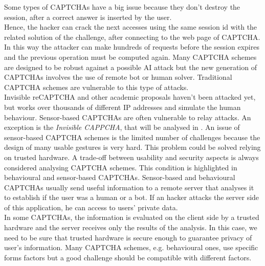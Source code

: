 \begin{itemize}
{Some types of CAPTCHAs have a big issue because they don't destroy the session, after a correct answer is inserted by the user\cite{text_audio}.\\
Hence, the hacker can crack the next accesses using the same session id with the related solution of the challenge, after connecting to the web page of CAPTCHA. In this way the attacker can make hundreds of requests before the session expires and the previous operation must be computed again.}
{Many CAPTCHA schemes are designed to be robust against a possible AI attack but the new generation of CAPTCHAs involves the use of remote bot or human solver. Traditional CAPTCHA schemes are vulnerable to this type of attacks.\\
Invisible reCAPTCHA and other academic proposals haven't been attacked yet, but works over thousands of different IP addresses and simulate the human behaviour. Sensor-based CAPTCHAs are often vulnerable to relay attacks. An exception is the \textit{Invisible CAPPCHA}, that will be analysed in .
}
{An issue of sensor-based CAPTCHA schemes is the limited number of challenges because the design of many usable gestures is very hard. This problem could be solved
relying on trusted hardware.}
{A trade-off between usability and security aspects is always considered analysing CAPTCHA schemes. This condition is highlighted in behavioural and sensor-based CAPTCHAs.}
{Sensor-based and behavioural CAPTCHAs usually send useful information to a remote server that analyses it to establish if the user was a human or a bot. If an hacker attacks the server side of this application, he can access to users' private data.\\
In some CAPTCHAs, the information is evaluated on the client side by a trusted hardware and the server receives only the results of the analysis. In this case, we need to be sure that trusted hardware is secure enough to guarantee privacy of user's information.
}
{Many CAPTCHA schemes, e.g. behavioural ones, use specific forms factors but a good challenge should be compatible with different factors.}
\end{itemize}

